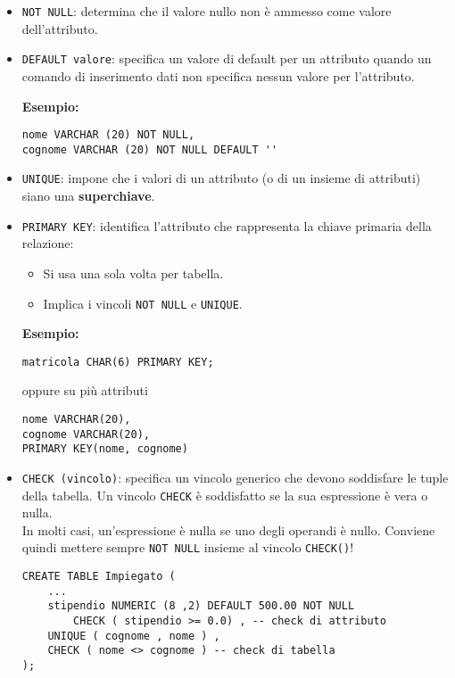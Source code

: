 \documentclass[a4paper, 10pt, titlepage]{article}
\begin{document}
	\begin{itemize}
		\item \lstinline|NOT NULL|: determina che il valore nullo non è ammesso come
		valore dell’attributo.
		\item \lstinline|DEFAULT valore|: specifica un valore di
		default per un attributo quando un comando di inserimento dati non specifica nessun valore per l’attributo.
		
	\textbf{Esempio:}
	\begin{lstlisting}
nome VARCHAR (20) NOT NULL,
cognome VARCHAR (20) NOT NULL DEFAULT ''
	\end{lstlisting}
		\item \lstinline|UNIQUE|: impone che i valori di un attributo (o di un insieme di
		attributi) siano una \textbf{superchiave}.
		\item \lstinline|PRIMARY KEY|: identifica l’attributo che rappresenta la chiave
		primaria della relazione:
		\begin{itemize}
			\item Si usa una sola volta per tabella.
			\item Implica i vincoli \lstinline|NOT NULL| e \lstinline|UNIQUE|.
		\end{itemize}
	
	\textbf{Esempio: }
	\begin{lstlisting}
matricola CHAR(6) PRIMARY KEY;
	\end{lstlisting}
	oppure su più attributi
	\begin{lstlisting}
nome VARCHAR(20),
cognome VARCHAR(20),
PRIMARY KEY(nome, cognome)
	\end{lstlisting}
	
	\item \lstinline|CHECK (vincolo)|: specifica un vincolo generico che devono soddisfare le tuple della tabella.
	Un vincolo \lstinline|CHECK| è soddisfatto se la sua espressione è vera o nulla. \\
In molti casi, un’espressione è nulla se uno degli operandi è nullo. Conviene quindi mettere sempre \lstinline|NOT NULL| insieme al vincolo \lstinline|CHECK()|!
	\begin{lstlisting}
CREATE TABLE Impiegato (
	...
	stipendio NUMERIC (8 ,2) DEFAULT 500.00 NOT NULL
		CHECK ( stipendio >= 0.0) , -- check di attributo
	UNIQUE ( cognome , nome ) ,
	CHECK ( nome <> cognome ) -- check di tabella
);
	\end{lstlisting}
	
	\end{itemize}
	
\end{document}
